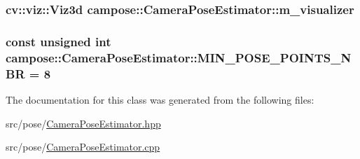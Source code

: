 \subsubsection[{\texorpdfstring{m\+\_\+visualizer}{m_visualizer}}]{\setlength{\rightskip}{0pt plus 5cm}cv\+::viz\+::\+Viz3d campose\+::\+Camera\+Pose\+Estimator\+::m\+\_\+visualizer\hspace{0.3cm}{\ttfamily [private]}}\hypertarget{classcampose_1_1CameraPoseEstimator_a36fa39fcb86bb8758846d1dd0aaa14e9}{}\label{classcampose_1_1CameraPoseEstimator_a36fa39fcb86bb8758846d1dd0aaa14e9}
\subsubsection[{\texorpdfstring{M\+I\+N\+\_\+\+P\+O\+S\+E\+\_\+\+P\+O\+I\+N\+T\+S\+\_\+\+N\+BR}{MIN_POSE_POINTS_NBR}}]{\setlength{\rightskip}{0pt plus 5cm}const unsigned int campose\+::\+Camera\+Pose\+Estimator\+::\+M\+I\+N\+\_\+\+P\+O\+S\+E\+\_\+\+P\+O\+I\+N\+T\+S\+\_\+\+N\+BR = 8\hspace{0.3cm}{\ttfamily [static]}}\hypertarget{classcampose_1_1CameraPoseEstimator_ab9495b3f0c0be7276c853bfb97a40f3e}{}\label{classcampose_1_1CameraPoseEstimator_ab9495b3f0c0be7276c853bfb97a40f3e}


The documentation for this class was generated from the following files\+:\begin{DoxyCompactItemize}
\item 
src/pose/\hyperlink{CameraPoseEstimator_8hpp}{Camera\+Pose\+Estimator.\+hpp}\item 
src/pose/\hyperlink{CameraPoseEstimator_8cpp}{Camera\+Pose\+Estimator.\+cpp}\end{DoxyCompactItemize}
